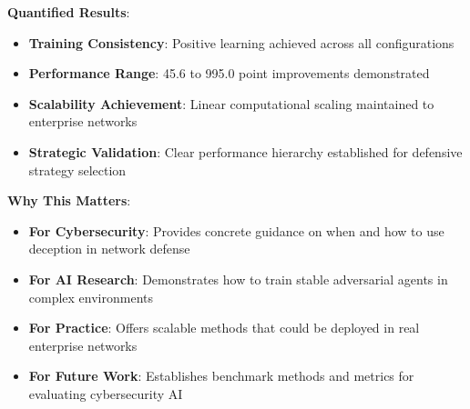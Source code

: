 \documentclass[11pt]{article}
\begin{document}
\begin{intuition}
\begin{example}
\textbf{Quantified Results}:
\begin{itemize}
\item \textbf{Training Consistency}: Positive learning achieved across all configurations
\item \textbf{Performance Range}: 45.6 to 995.0 point improvements demonstrated
\item \textbf{Scalability Achievement}: Linear computational scaling maintained to enterprise networks
\item \textbf{Strategic Validation}: Clear performance hierarchy established for defensive strategy selection
\end{itemize}
\end{example}

% 

\begin{intuition}
\textbf{Why This Matters}:
\begin{itemize}
\item \textbf{For Cybersecurity}: Provides concrete guidance on when and how to use deception in network defense
\item \textbf{For AI Research}: Demonstrates how to train stable adversarial agents in complex environments
\item \textbf{For Practice}: Offers scalable methods that could be deployed in real enterprise networks
\item \textbf{For Future Work}: Establishes benchmark methods and metrics for evaluating cybersecurity AI
\end{itemize}
\end{intuition}


\end{intuition}
\end{document}
